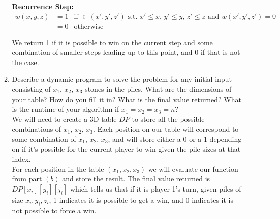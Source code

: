 \documentclass{article}
\begin{document}
\begin{enumerate}
\begin{enumerate}
\textbf{Recurrence Step:}
\begin{align*}
    w(x,y,z) & = 1 & \text{if $\in (x', y', z')$ s.t. $x' \leq x$, $y' \leq y$, $z' \leq z$ and $w(x', y', z') = 0$} \\
    & = 0 & \text{otherwise}
\end{align*}

We return 1 if it is possible to win on the current step and some combination of smaller steps leading up to this point, and 0 if that is not the case. \\




\item Describe a dynamic program to solve the problem for any initial input consisting of $x_1$, $x_2$, $x_3$ stones in the piles. What are the dimensions of your table? How do you fill it in? What is the final value returned? What is the runtime of your algorithm if $x_1 = x_2 = x_3 = n$? \\

We will need to create a 3D table $DP$ to store all the possible combinations of $x_1$, $x_2$, $x_3$. Each position on our table will correspond to some combination of $x_1$, $x_2$, $x_3$, and will store either a 0 or a 1 depending on if it's possible for the current player to win given the pile sizes at that index. \\
\newline 
For each position in the table $(x_1, x_2, x_3)$ we will evaluate our function from part $(b)$ and store the result. The final value returned is $DP[x_i][y_i][j_i]$ which tells us that if it is player 1's turn, given piles of size $x_i, y_i, z_i$, 1 indicates it is possible to get a win, and 0 indicates it is not possible to force a win. \\
\newline
\end{enumerate}






\end{enumerate}
\end{document}
